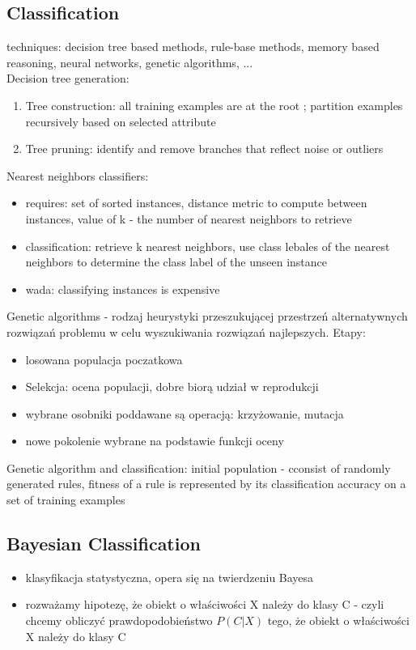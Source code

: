 \documentclass[10pt,a4paper]{article}
\begin{document}
\subsection{Classification}
techniques: decision tree based methods, rule-base methods, memory based reasoning, neural networks, genetic algorithms, ... \\
Decision tree generation:
  \begin{enumerate}
    \item Tree construction: all training examples are at the root ; partition examples recursively based on selected attribute
    \item Tree pruning: identify and remove branches that reflect noise or outliers
  \end{enumerate}
  Nearest neighbors classifiers:
  \begin{itemize}
    \item requires: set of sorted instances, distance metric to compute between instances, value of k - the number of nearest neighbors to retrieve
    \item classification: retrieve k nearest neighbors, use class lebales of the nearest neighbors to determine the class label of the unseen instance
    \item wada: classifying instances is expensive
  \end{itemize}
  Genetic algorithms - rodzaj heurystyki przeszukującej przestrzeń alternatywnych rozwiązań problemu w celu wyszukiwania rozwiązań najlepszych. Etapy:
  \begin{itemize}
    \item losowana populacja poczatkowa
    \item Selekcja: ocena populacji, dobre biorą udział w reprodukcji
    \item wybrane osobniki poddawane są operacją: krzyżowanie, mutacja
    \item nowe pokolenie wybrane na podstawie funkcji oceny
  \end{itemize}
  Genetic algorithm and classification: initial population - cconsist of randomly generated rules, fitness of a rule is represented by its classification accuracy on a set of training examples
\subsection{Bayesian Classification}
  \begin{itemize}
    \item klasyfikacja statystyczna, opera się na twierdzeniu Bayesa
    \item rozważamy hipotezę, że obiekt o właściwości X należy do klasy C - czyli chcemy obliczyć prawdopodobieństwo $P(C | X)$ tego, że obiekt o właściwości X należy do klasy C
  \end{itemize}
\end{document}
